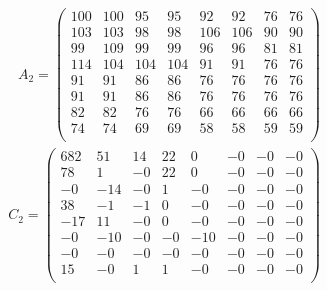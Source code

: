\documentclass[paper=a4, fontsize=11pt]{scrartcl} %
\begin{document}
\begin{align*}
    \begin{split}
        A_{2} =
        \begin{pmatrix}
            100 & 100 & 95  & 95  & 92  & 92  & 76  & 76\\
            103 & 103 & 98  & 98  & 106 & 106 & 90  & 90\\
            99  & 109 & 99  & 99  & 96  & 96  & 81  & 81\\
            114 & 104 & 104 & 104 & 91  & 91  & 76  & 76\\
            91  & 91  & 86  & 86  & 76  & 76  & 76  & 76\\
            91  & 91  & 86  & 86  & 76  & 76  & 76  & 76\\
            82  & 82  & 76  & 76  & 66  & 66  & 66  & 66\\
            74  & 74  & 69  & 69  & 58  & 58  & 59  & 59\\
        \end{pmatrix}
    \end{split}
    \begin{split}
        C_{2} =
        \begin{pmatrix}
            682 & 51  & 14  & 22  & 0   & -0  & -0  & -0\\
            78  & 1   & -0  & 22  & 0   & -0  & -0  & -0\\
            -0  & -14 & -0  & 1   & -0  & -0  & -0  & -0\\
            38  & -1  & -1  & 0   & -0  & -0  & -0  & -0\\
            -17 & 11  & -0  & 0   & -0  & -0  & -0  & -0\\
            -0  & -10 & -0  & -0  & -10 & -0  & -0  & -0\\
            -0  & -0  & -0  & -0  & -0  & -0  & -0  & -0\\
            15  & -0  & 1   & 1   & -0  & -0  & -0  & -0\\
        \end{pmatrix}
    \end{split}
\end{align*}
\end{document}
